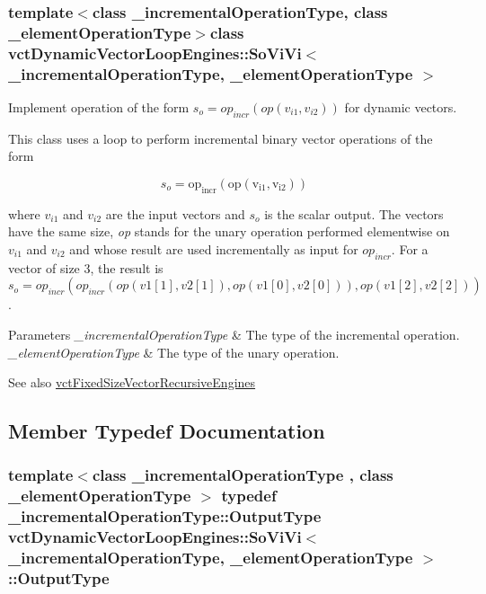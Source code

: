 \subsubsection*{template$<$class \+\_\+incremental\+Operation\+Type, class \+\_\+element\+Operation\+Type$>$class vct\+Dynamic\+Vector\+Loop\+Engines\+::\+So\+Vi\+Vi$<$ \+\_\+incremental\+Operation\+Type, \+\_\+element\+Operation\+Type $>$}

Implement operation of the form $s_o = op_{incr}(op(v_{i1}, v_{i2}))$ for dynamic vectors. 

This class uses a loop to perform incremental binary vector operations of the form

\[ s_o = \mathrm{op_{incr}(\mathrm{op}(v_{i1}, v_{i2}))} \]

where $v_{i1}$ and $v_{i2}$ are the input vectors and $s_o$ is the scalar output. The vectors have the same size, {\itshape op} stands for the unary operation performed elementwise on $v_{i1}$ and $v_{i2}$ and whose result are used incrementally as input for $op_{incr}$. For a vector of size 3, the result is $s_o = op_{incr}(op_{incr}(op(v1[1], v2[1]), op(v1[0], v2[0])), op(v1[2], v2[2]))$.


\begin{DoxyParams}{Parameters}
{\em \+\_\+incremental\+Operation\+Type} & The type of the incremental operation.\\
\hline
{\em \+\_\+element\+Operation\+Type} & The type of the unary operation.\\
\hline
\end{DoxyParams}
\begin{DoxySeeAlso}{See also}
\hyperlink{classvct_fixed_size_vector_recursive_engines}{vct\+Fixed\+Size\+Vector\+Recursive\+Engines} 
\end{DoxySeeAlso}


\subsection{Member Typedef Documentation}
\hypertarget{classvct_dynamic_vector_loop_engines_1_1_so_vi_vi_af495d5a3b96441aefe55b21a9988d335}{}
\subsubsection[{Output\+Type}]{\setlength{\rightskip}{0pt plus 5cm}template$<$class \+\_\+incremental\+Operation\+Type , class \+\_\+element\+Operation\+Type $>$ typedef \+\_\+incremental\+Operation\+Type\+::\+Output\+Type {\bf vct\+Dynamic\+Vector\+Loop\+Engines\+::\+So\+Vi\+Vi}$<$ \+\_\+incremental\+Operation\+Type, \+\_\+element\+Operation\+Type $>$\+::{\bf Output\+Type}}\label{classvct_dynamic_vector_loop_engines_1_1_so_vi_vi_af495d5a3b96441aefe55b21a9988d335}



